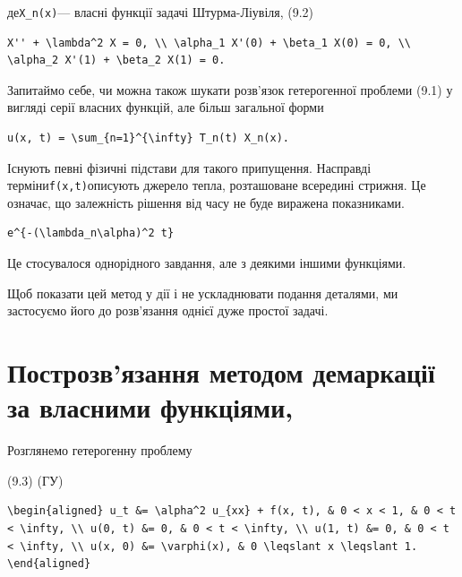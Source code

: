 \documentclass[
  ukrainian,
]{article}
\begin{document}
де\texttt{X\_n(x)}--- власні функції задачі Штурма-Ліувіля, (9.2)

\begin{verbatim}
X'' + \lambda^2 X = 0, \\ \alpha_1 X'(0) + \beta_1 X(0) = 0, \\ \alpha_2 X'(1) + \beta_2 X(1) = 0.
\end{verbatim}

Запитаймо себе, чи можна також шукати розв'язок гетерогенної проблеми
(9.1) у вигляді серії власних функцій, але більш загальної форми

\begin{verbatim}
u(x, t) = \sum_{n=1}^{\infty} T_n(t) X_n(x).
\end{verbatim}

Існують певні фізичні підстави для такого припущення. Насправді
терміни\texttt{f(x,t)}описують джерело тепла, розташоване всередині
стрижня. Це означає, що залежність рішення від часу не буде виражена
показниками.

\begin{verbatim}
e^{-(\lambda_n\alpha)^2 t}
\end{verbatim}

Це стосувалося однорідного завдання, але з деякими іншими функціями.

Щоб показати цей метод у дії і не ускладнювати подання деталями, ми
застосуємо його до розв'язання однієї дуже простої задачі.

\section{Построзв'язання методом демаркації за власними
функціями,}\label{ux43fux43eux441ux442ux440ux43eux437ux432ux44fux437ux430ux43dux43dux44f-ux43cux435ux442ux43eux434ux43eux43c-ux434ux435ux43cux430ux440ux43aux430ux446ux456ux457-ux437ux430-ux432ux43bux430ux441ux43dux438ux43cux438-ux444ux443ux43dux43aux446ux456ux44fux43cux438}

Розглянемо гетерогенну проблему

(9.3) (ГУ)

\begin{verbatim}
\begin{aligned} u_t &= \alpha^2 u_{xx} + f(x, t), & 0 < x < 1, & 0 < t < \infty, \\ u(0, t) &= 0, & 0 < t < \infty, \\ u(1, t) &= 0, & 0 < t < \infty, \\ u(x, 0) &= \varphi(x), & 0 \leqslant x \leqslant 1. \end{aligned}
\end{verbatim}
\end{document}
